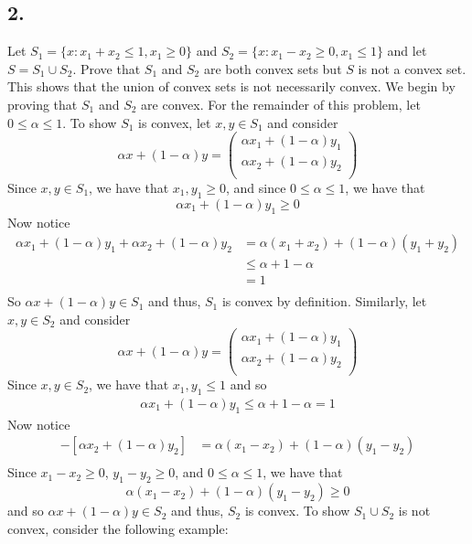 \documentclass{article}
\begin{document}
\subsection*{2.} Let $S_1 = \{x : x_1 + x_2 \leq 1, x_1 \geq 0\}$ and $S_2 = \{x : x_1 - x_2 \geq 0, x_1 \leq 1\}$ and let $S = S_1 \cup S_2$. Prove that $S_1$ and $S_2$ are both convex sets but $S$ is not a convex set. This shows that the union of convex sets is not necessarily convex.
\newline\newline
We begin by proving that $S_1$ and $S_2$ are convex. For the remainder of this problem, let $0\leq\alpha\leq1$. To show $S_1$ is convex, let $x,y \in S_1$ and consider
\[\alpha x + (1 - \alpha)y = \begin{pmatrix}
\alpha x_1 + (1 - \alpha)y_1 \\
\alpha x_2 + (1 - \alpha)y_2 \\
\end{pmatrix}\]
Since $x,y \in S_1$, we have that $x_1, y_1 \geq 0$, and since $0 \leq \alpha \leq 1$, we have that
\[\alpha x_1 + (1 - \alpha)y_1 \geq 0\]
Now notice
\begin{align*}
    \alpha x_1 + (1 - \alpha)y_1 + \alpha x_2 + (1 - \alpha)y_2 &= \alpha(x_1 + x_2) + (1 - \alpha)(y_1 + y_2) \\
    &\leq \alpha + 1 - \alpha \\
    &= 1 \\
\end{align*}
So $\alpha x + (1 - \alpha)y \in S_1$ and thus, $S_1$ is convex by definition. Similarly, let $x,y \in S_2$ and consider 
\[\alpha x + (1 - \alpha)y = \begin{pmatrix}
    \alpha x_1 + (1 - \alpha)y_1 \\
    \alpha x_2 + (1 - \alpha)y_2 \\
\end{pmatrix}\]
Since $x,y \in S_2$, we have that $x_1, y_1 \leq 1$ and so 
\begin{align*}
    \alpha x_1+ (1 - \alpha)y_1 \leq \alpha + 1 - \alpha = 1
\end{align*}
Now notice
\begin{align*}
    [\alpha x_1 + (1 - \alpha)y_1] - [\alpha x_2 + (1 - \alpha)y_2] &= \alpha(x_1 - x_2) + (1 - \alpha)(y_1 - y_2) \\
\end{align*}
Since $x_1 - x_2 \geq 0$, $y_1 - y_2 \geq 0$, and $0 \leq \alpha \leq 1$, we have that
\[\alpha(x_1 - x_2) + (1 - \alpha)(y_1 - y_2) \geq 0\]
and so $\alpha x + (1 - \alpha)y \in S_2$ and thus, $S_2$ is convex. To show $S_1 \cup S_2$ is not convex, consider the following example:
\end{document}
